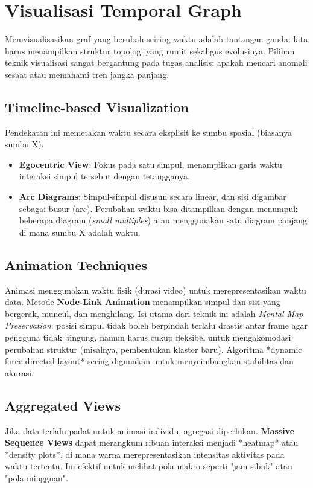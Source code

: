 \documentclass[12pt,a4paper]{book}
\begin{document}
\chapter{Visualisasi Temporal Graph}
Memvisualisasikan graf yang berubah seiring waktu adalah tantangan ganda: kita harus menampilkan struktur topologi yang rumit sekaligus evolusinya. Pilihan teknik visualisasi sangat bergantung pada tugas analisis: apakah mencari anomali sesaat atau memahami tren jangka panjang.

\section{Timeline-based Visualization}
Pendekatan ini memetakan waktu secara eksplisit ke sumbu spasial (biasanya sumbu X).
\begin{itemize}
    \item \textbf{Egocentric View}: Fokus pada satu simpul, menampilkan garis waktu interaksi simpul tersebut dengan tetangganya.
    \item \textbf{Arc Diagrams}: Simpul-simpul disusun secara linear, dan sisi digambar sebagai busur (arc). Perubahan waktu bisa ditampilkan dengan menumpuk beberapa diagram (\textit{small multiples}) atau menggunakan satu diagram panjang di mana sumbu X adalah waktu.
\end{itemize}

\section{Animation Techniques}
Animasi menggunakan waktu fisik (durasi video) untuk merepresentasikan waktu data.
Metode \textbf{Node-Link Animation} menampilkan simpul dan sisi yang bergerak, muncul, dan menghilang.
Isi utama dari teknik ini adalah \textit{Mental Map Preservation}: posisi simpul tidak boleh berpindah terlalu drastis antar frame agar pengguna tidak bingung, namun harus cukup fleksibel untuk mengakomodasi perubahan struktur (misalnya, pembentukan klaster baru). Algoritma *dynamic force-directed layout* sering digunakan untuk menyeimbangkan stabilitas dan akurasi.

\section{Aggregated Views}
Jika data terlalu padat untuk animasi individu, agregasi diperlukan.
\textbf{Massive Sequence Views} dapat merangkum ribuan interaksi menjadi *heatmap* atau *density plots*, di mana warna merepresentasikan intensitas aktivitas pada waktu tertentu. Ini efektif untuk melihat pola makro seperti "jam sibuk" atau "pola mingguan".
\end{document}
